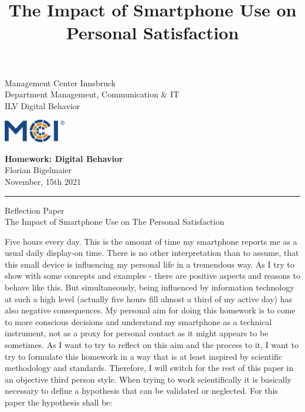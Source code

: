 \documentclass[11pt,a4paper]{article}
\newcommand{\fontsmall}{\fontsize{7pt}{10pt}\selectfont}
\newcommand{\fontnormal}{\fontsize{11pt}{16pt}\selectfont}
\newcommand{\headline}{\fontsize{17pt}{26pt}\selectfont}
\begin{document}
   \title{The Impact of Smartphone Use on Personal Satisfaction} 



\noindent\begin{minipage}{0.5\textwidth}
\fontsmall
Management Center Innsbruck \\
Department Management, Communication \& IT  \\
ILV Digital Behavior


\end{minipage}%
\hfill%
\begin{minipage}{0.3\textwidth}\raggedleft
\includegraphics[height=1.0cm]{mci-logo.png}

\end{minipage}


 
\begin{center}
\textbf{Homework: Digital Behavior}\\   %
Florian Bigelmaier\\                         %
November, 15th 2021\\                         %
\end{center}
\rule{\linewidth}{0.1mm}



\headline \begin{center}
Reflection Paper\\
The Impact of Smartphone Use on The Personal Satisfaction
\end{center} 
\fontnormal 
Five hours every day. This is the amount of time my smartphone reports me as a usual daily display-on time. There is no other interpretation than to assume, that this small device is influencing my personal life in a tremendous way. As I try to show with some concepts and examples - there are positive aspects and reasons to behave like this. But simultaneously, being influenced by information technology at such a high level (actually five hours fill almost a third of my active day) has also negative consequences. My personal aim for doing this homework is to come to more conscious decisions and understand my smartphone as a technical instrument, not as a proxy for personal contact as it might appears to be sometimes. As I want to try to reflect on this aim and the process to it, I want to try to formulate this homework in a way that is at least inspired by scientific methodology and standards. Therefore, I will switch for the rest of this paper in an objective third person style. When trying to work scientifically it is basically necessary to define a hypothesis that can be validated or neglected. For this paper the hypothesis shall be:
\end{document}

